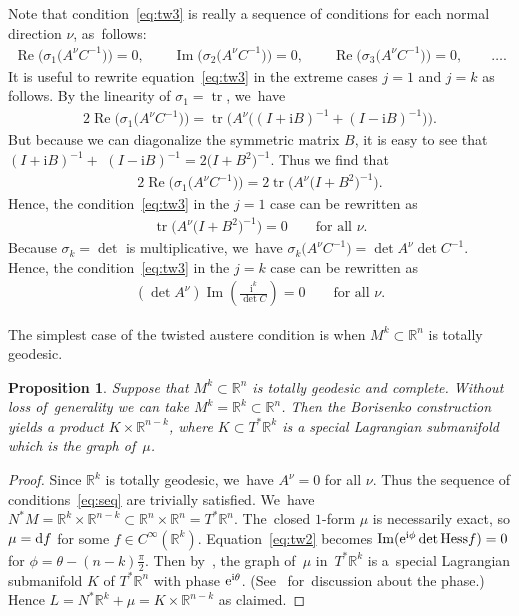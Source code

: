 \documentclass[pdftex]{sigma}
\def\R{\mathbb{R}}
\def\ri{\mathrm{i}}
\renewcommand{\Im}{\operatorname{Im}}
\renewcommand{\Re}{\operatorname{Re}}
\def\tr{\operatorname{tr}}
\newtheorem{Proposition}[Theorem]{Proposition}
\numberwithin{equation}{section}
\begin{document}
Note that condition~\eqref{eq:tw3} is really a sequence of conditions for each normal direction $\nu$, as~follows:
\begin{gather} \label{eq:seq}
\Re \big(\sigma_1 \big(A^\nu C^{-1}\big) \big) = 0, \qquad
\Im \big(\sigma_2 \big(A^\nu C^{-1}\big) \big) = 0, \qquad
\Re \big(\sigma_3 \big(A^\nu C^{-1}\big) \big) = 0, \qquad \dots.
\end{gather}
It is useful to rewrite equation~\eqref{eq:tw3} in the extreme cases $j=1$ and $j=k$ as follows. By the linearity of $\sigma_1 = \tr$, we~have
\begin{gather*}
2 \Re \big(\sigma_1 \big(A^\nu C^{-1}\big)\big) = \tr \big(A^{\nu} \big((I + \ri B)^{-1} + (I - \ri B)^{-1}\big)\big).
\end{gather*}
But because we can diagonalize the symmetric matrix $B$, it is easy to see that $(I + \ri B)^{-1} +$ $(I - \ri B)^{-1} = 2 \big(I + B^2\big)^{-1}$. Thus we find that
\begin{gather*}
2 \Re \big( \sigma_1 \big(A^\nu C^{-1}\big) \big) = 2 \tr \big( A^{\nu} \big(I + B^2\big)^{-1} \big).
\end{gather*}
Hence, the condition~\eqref{eq:tw3} in the $j=1$ case can be rewritten as
\begin{gather} \label{eq:tw3-special1}
\tr \big(A^{\nu} \big(I + B^2\big)^{-1}\big) = 0 \qquad \text{for all $\nu$}.
\end{gather}
Because $\sigma_k = \det$ is multiplicative, we~have $\sigma_k \big(A^{\nu} C^{-1}\big) = \det A^{\nu} \det C^{-1}$. Hence, the condition~\eqref{eq:tw3} in the $j=k$ case can be rewritten as
\begin{gather}\label{eq:tw3-specialk}
(\det A^{\nu}) \Im \left(\frac{\ri^k}{\det C}\right) = 0 \qquad \text{for all $\nu$}.
\end{gather}

The simplest case of the twisted austere condition is when $M^k \subset \R^n$ is totally geodesic.

\begin{Proposition} \label{prop:totally-geodesic}
Suppose that $M^k \subset \R^n$ is \emph{totally geodesic} and complete. Without loss of~gene\-ra\-lity we can take $M^k = \R^k \subset \R^n$. Then the Borisenko construction yields a pro\-duct $K \times \R^{n-k}$, where $K \subset T^* \R^k$ is a special Lagrangian submanifold which is the graph of~$\mu$.
\end{Proposition}
\begin{proof}
Since $\R^k$ is totally geodesic, we~have $A^{\nu} = 0$ for all $\nu$. Thus the sequence of conditions~\eqref{eq:seq} are trivially satisfied. We~have $N^* M = \R^k \times \R^{n-k} \subset \R^n \times \R^n = T^* \R^n$. The~closed $1$-form $\mu$ is necessarily exact, so $\mu = {\rm d} f$ for some $f \in C^{\infty} (\R^k)$. Equation~\eqref{eq:tw2} becomes $\Im ({\rm e}^{\ri \phi} \det \mathrm{Hess} f) = 0$ for $\phi = \theta - (n-k) \frac{\pi}{2}$. Then by~\cite[Theorem 2.3]{HL}, the graph of~$\mu$ in~$T^* \R^k$ is a~special Lagrangian submanifold $K$ of $T^* \R^n$ with phase ${\rm e}^{\ri \theta}$. (See~\cite[Theorem 2.3]{KL} for~discus\-sion about the phase.) Hence $L = N^* \R^k + \mu = K \times \R^{n-k}$ as claimed.
\end{proof}
\end{document}
